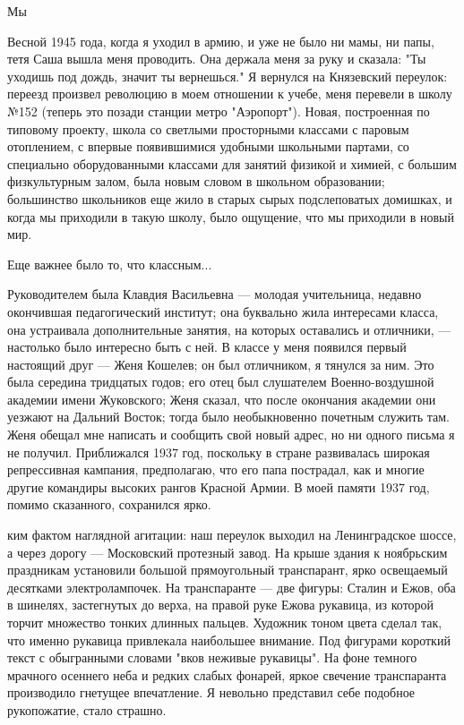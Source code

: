 
\label{157-1}
Мы

Весной 1945 года, когда я уходил в армию, и уже не было ни мамы, ни папы, тетя Саша вышла меня проводить. Она держала меня за руку и сказала: "Ты уходишь под дождь, значит ты вернешься." Я вернулся на Князевский переулок: переезд произвел революцию в моем отношении к учебе, меня перевели в школу №152 (теперь это позади станции метро "Аэропорт"). Новая, построенная по типовому проекту, школа со светлыми просторными классами с паровым отоплением, с впервые появившимися удобными школьными партами, со специально оборудованными классами для занятий физикой и химией, с большим физкультурным залом, была новым словом в школьном образовании; большинство школьников еще жило в старых сырых подслеповатых домишках, и когда мы приходили в такую школу, было ощущение, что мы приходили в новый мир.

Еще важнее было то, что классным...

\label{158-1}
Руководителем была Клавдия Васильевна — молодая учительница, недавно окончившая педагогический институт; она буквально жила интересами класса, она устраивала дополнительные занятия, на которых оставались и отличники, — настолько было интересно быть с ней. В классе у меня появился первый настоящий друг — Женя Кошелев; он был отличником, я тянулся за ним. Это была середина тридцатых годов; его отец был слушателем Военно-воздушной академии имени Жуковского; Женя сказал, что после окончания академии они уезжают на Дальний Восток; тогда было необыкновенно почетным служить там. Женя обещал мне написать и сообщить свой новый адрес, но ни одного письма я не получил. Приближался 1937 год, поскольку в стране развивалась широкая репрессивная кампания, предполагаю, что его папа пострадал, как и многие другие командиры высоких рангов Красной Армии. В моей памяти 1937 год, помимо сказанного, сохранился ярко.

\label{159-1}
ким фактом наглядной агитации: наш переулок выходил на Ленинградское шоссе, а через дорогу — Московский протезный завод. На крыше здания к ноябрьским праздникам установили большой прямоугольный транспарант, ярко освещаемый десятками электролампочек. На транспаранте — две фигуры: Сталин и Ежов, оба в шинелях, застегнутых до верха, на правой руке Ежова рукавица, из которой торчит множество тонких длинных пальцев. Художник тоном цвета сделал так, что именно рукавица привлекала наибольшее внимание. Под фигурами короткий текст с обыгранными словами "вков неживые рукавицы". На фоне темного мрачного осеннего неба и редких слабых фонарей, яркое свечение транспаранта производило гнетущее впечатление. Я невольно представил себе подобное рукопожатие, стало страшно.

